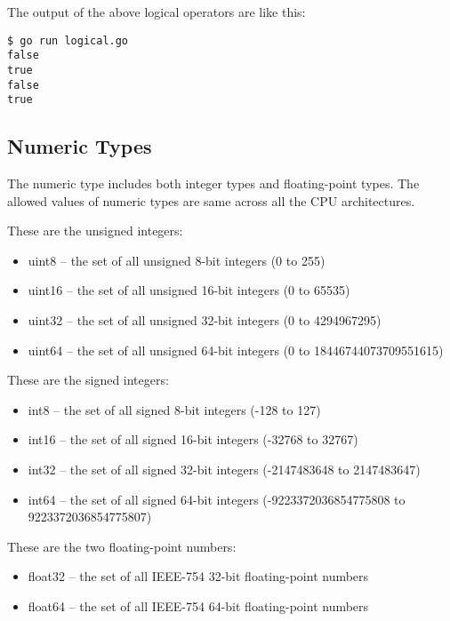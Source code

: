 

The output of the above logical operators are like this:

\begin{lstlisting}[numbers=none]
$ go run logical.go
false
true
false
true
\end{lstlisting}

\subsection{Numeric Types}

The numeric type includes both integer types and floating-point types.
The allowed values of numeric types are same across all the CPU
architectures.

These are the unsigned integers: 

\begin{itemize}
\item  uint8 -- the set of all unsigned  8-bit integers (0 to 255)
\item  uint16 -- the set of all unsigned 16-bit integers (0 to 65535)
\item  uint32 -- the set of all unsigned 32-bit integers (0 to 4294967295)
\item  uint64 -- the set of all unsigned 64-bit integers (0 to 18446744073709551615)
\end{itemize}

These are the signed integers:

\begin{itemize}
\item int8 -- the set of all signed  8-bit integers (-128 to 127)
\item int16 -- the set of all signed 16-bit integers (-32768 to 32767)
\item int32 -- the set of all signed 32-bit integers (-2147483648 to 2147483647)
\item int64 -- the set of all signed 64-bit integers (-9223372036854775808 to 9223372036854775807)
\end{itemize}

These are the two floating-point numbers:

\begin{itemize}
\item float32 -- the set of all IEEE-754 32-bit floating-point numbers
\item float64 -- the set of all IEEE-754 64-bit floating-point numbers
\end{itemize}

